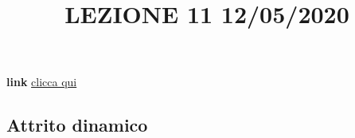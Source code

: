 \title{LEZIONE 11 12/05/2020}\newline
\textbf{link} \href{https://web.microsoftstream.com/video/5bd1efee-fafa-4133-8e33-37fcd8b66da5}{clicca qui}
\subsection{Attrito dinamico}